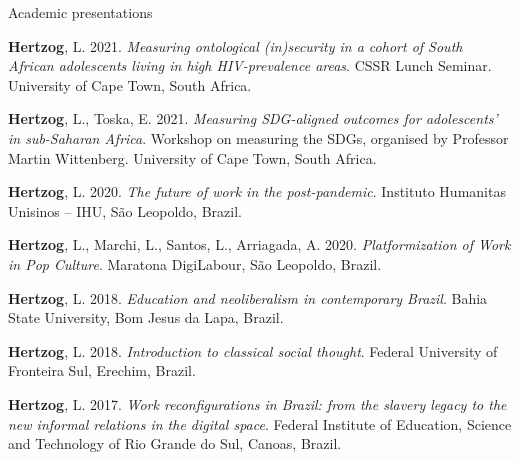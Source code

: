 \begin{rSection}{Academic presentations}
\begin{etaremune}
\item \textbf{Hertzog}, L. 2021. \textit{Measuring ontological (in)security in a cohort of South African adolescents living in high HIV-prevalence areas}. CSSR Lunch Seminar. University of Cape Town, South Africa.

\item \textbf{Hertzog}, L., Toska, E. 2021. \textit{Measuring SDG-aligned outcomes for adolescents' in sub-Saharan Africa}. Workshop on measuring the SDGs, organised by Professor Martin Wittenberg. University of Cape Town, South Africa.

\item \textbf{Hertzog}, L. 2020. \textit{The future of work in the post-pandemic}. Instituto Humanitas Unisinos – IHU, São Leopoldo, Brazil. \href{https://www.youtube.com/watch?v=57Y0fkGoYsU}{\textcolor{red}{\faYoutube}} 

\item \textbf{Hertzog}, L., Marchi, L., Santos, L., Arriagada, A. 2020. \textit{Platformization of Work in Pop Culture}. {Maratona DigiLabour}, São Leopoldo, Brazil. 

\item \textbf{Hertzog}, L. 2018. \textit{Education and neoliberalism in contemporary Brazil}. Bahia State University, Bom Jesus da Lapa, Brazil. 

\item \textbf{Hertzog}, L. 2018. \textit{Introduction to classical social thought}. Federal University of Fronteira Sul, Erechim, Brazil.

\item \textbf{Hertzog}, L. 2017. \textit{Work reconfigurations in Brazil: from the slavery legacy to the new informal relations in the digital space}. Federal Institute of Education, Science and Technology of Rio Grande do Sul, Canoas, Brazil.

\end{etaremune}


\end{rSection}